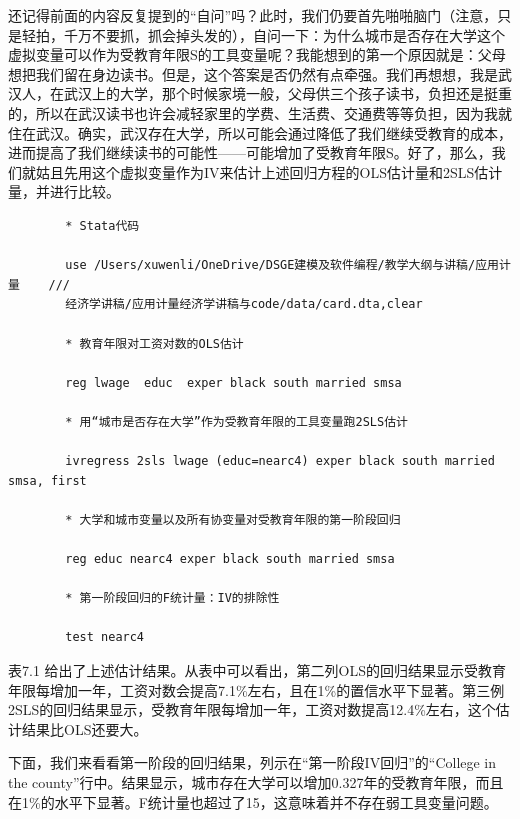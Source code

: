 \documentclass[cn,12pt,math=newtx,citestyle=gb7714-2015,bibstyle=gb7714-2015]{elegantbook}
\begin{document}
	还记得前面的内容反复提到的“自问”吗？此时，我们仍要首先啪啪脑门（注意，只是轻拍，千万不要抓，抓会掉头发的），自问一下：为什么城市是否存在大学这个虚拟变量可以作为受教育年限S的工具变量呢？我能想到的第一个原因就是：父母想把我们留在身边读书。但是，这个答案是否仍然有点牵强。我们再想想，我是武汉人，在武汉上的大学，那个时候家境一般，父母供三个孩子读书，负担还是挺重的，所以在武汉读书也许会减轻家里的学费、生活费、交通费等等负担，因为我就住在武汉。确实，武汉存在大学，所以可能会通过降低了我们继续受教育的成本，进而提高了我们继续读书的可能性——可能增加了受教育年限S。好了，那么，我们就姑且先用这个虚拟变量作为IV来估计上述回归方程的OLS估计量和2SLS估计量，并进行比较。
	
	\begin{lstlisting}
		* Stata代码
		
		use /Users/xuwenli/OneDrive/DSGE建模及软件编程/教学大纲与讲稿/应用计量    ///
		经济学讲稿/应用计量经济学讲稿与code/data/card.dta,clear
		
		* 教育年限对工资对数的OLS估计
		
		reg lwage  educ  exper black south married smsa
		
		* 用“城市是否存在大学”作为受教育年限的工具变量跑2SLS估计
		
		ivregress 2sls lwage (educ=nearc4) exper black south married smsa, first 
		
		* 大学和城市变量以及所有协变量对受教育年限的第一阶段回归
		
		reg educ nearc4 exper black south married smsa
		
		* 第一阶段回归的F统计量：IV的排除性
		
		test nearc4
	\end{lstlisting}
	
	表7.1 给出了上述估计结果。从表中可以看出，第二列OLS的回归结果显示受教育年限每增加一年，工资对数会提高7.1\%左右，且在1\%的置信水平下显著。第三例2SLS的回归结果显示，受教育年限每增加一年，工资对数提高12.4\%左右，这个估计结果比OLS还要大。
	
	下面，我们来看看第一阶段的回归结果，列示在“第一阶段IV回归”的“College in the county”行中。结果显示，城市存在大学可以增加0.327年的受教育年限，而且在1\%的水平下显著。F统计量也超过了15，这意味着并不存在弱工具变量问题。
	
\end{document}

